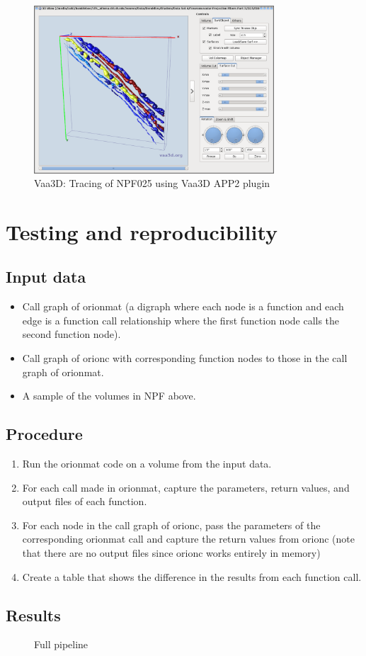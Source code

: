\documentclass[12pt]{article}
\begin{document}
\begin{figure}[H]
\centering
\includegraphics[width=0.8\textwidth]{gfx/vaa3d_DIADEM-NPF-3-025_APP2-tracing-3D-view}
\caption{Vaa3D: Tracing of NPF025 using Vaa3D APP2 plugin}
\end{figure}

\section{Testing and reproducibility}

\subsection{Input data}

\begin{itemize}
	\item Call graph of \gls{orionmat} (a digraph where each node is a
		function and each edge is a function call relationship where the first function
		node calls the second function node).
	\item Call graph of  \gls{orionc} with corresponding function nodes to
		those in the call graph of \gls{orionmat}.
	\item A sample of the volumes in NPF above.
\end{itemize}

\subsection{Procedure}

\begin{enumerate}
	\item Run the \gls{orionmat} code on a volume from the input data.
	\item For each call made in \gls{orionmat}, capture the
		parameters, return values, and output files of each function.
	\item For each node in the call graph of \gls{orionc}, pass the
		parameters of the corresponding \gls{orionmat} call and capture
		the return values from \gls{orionc} (note that there are no
		output files since \gls{orionc} works entirely in memory)
	\item Create a table that shows the difference in the results from each
		function call.
\end{enumerate}

\subsection{Results}

\begin{figure}

\caption{Full pipeline}
\end{figure}
\end{document}
